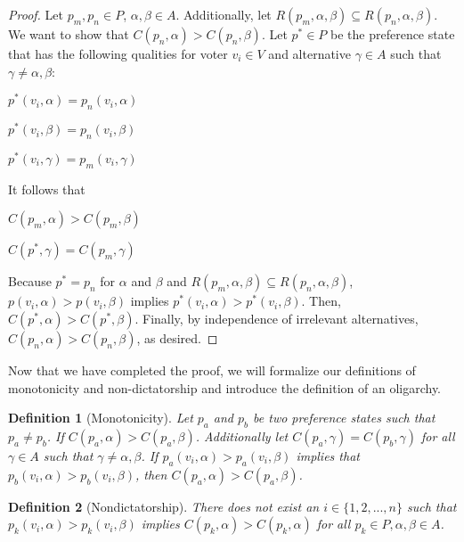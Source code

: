\documentclass{amsart}
\newtheorem{definition}{Definition}
\theoremstyle{plain}
\begin{document}
\begin{proof}
    Let $p_m, p_n \in P$, $\alpha, \beta \in A$. Additionally, let $R(p_m, \alpha, \beta) \subseteq R(p_n, \alpha, \beta)$. We want to show that $C(p_n, \alpha) > C(p_n, \beta)$. Let $p^* \in P$ be the preference state that has the following qualities for voter $v_i \in V$ and alternative $\gamma \in A$ such that $\gamma \ne \alpha, \beta$:

\begin{center}
    \item $p^*(v_i, \alpha) = p_n(v_i, \alpha)$
    \item $p^*(v_i, \beta) = p_n(v_i, \beta)$
    \item $p^*(v_i, \gamma) = p_m(v_i, \gamma)$
\end{center}

It follows that 

\begin{center}
    \item $C(p_m, \alpha) > C(p_m, \beta)$
    \item $C(p^*, \gamma) = C(p_m, \gamma)$
\end{center}

\noindent Because $p^* = p_n$ for $\alpha$ and $\beta$ and $R(p_m, \alpha, \beta) \subseteq R(p_n, \alpha, \beta)$, $p(v_i, \alpha) > p(v_i, \beta)$ implies $p^*(v_i, \alpha) > p^*(v_i, \beta)$. Then, $C(p^*, \alpha) > C(p^*, \beta)$. Finally, by independence of irrelevant alternatives, $C(p_n, \alpha) > C(p_n, \beta)$, as desired. 
\end{proof}

Now that we have completed the proof, we will formalize our definitions of monotonicity and non-dictatorship and introduce the definition of an oligarchy.

\begin{definition}[Monotonicity]
Let $p_a$ and $p_b$ be two preference states such that $p_a \ne p_b$. If $C(p_a, \alpha) > C(p_a, \beta)$. Additionally let $C(p_a, \gamma) = C (p_b, \gamma)$ for all $\gamma \in A$ such that $\gamma \ne \alpha, \beta$. If $p_a(v_i, \alpha) > p_a(v_i, \beta)$ implies that $p_b(v_i, \alpha) > p_b(v_i, \beta)$, then $C(p_a, \alpha) > C(p_a, \beta)$.  
\end{definition}

\begin{definition}[Nondictatorship]
There does not exist an $i \in \{1, 2, ... , n\}$ such that $p_k(v_i, \alpha) > p_k(v_i, \beta)$ implies $C(p_k, \alpha) > C(p_k, \alpha)$ for all $p_k \in P, \alpha, \beta \in A$.
\end{definition}
\end{document}
